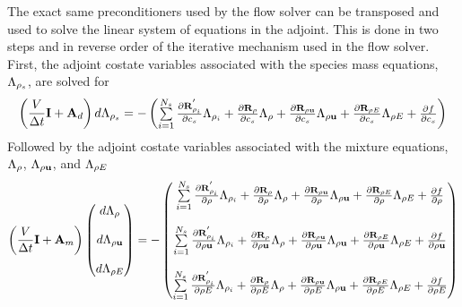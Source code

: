 \documentclass[a4paper]{report}
\begin{document}
The exact same preconditioners used by the flow solver can be transposed and
used to solve the linear system of equations in the adjoint.  This is done in
two steps and in reverse order of the iterative mechanism used in the flow
solver. First, the adjoint costate variables associated with the species mass
equations, $\Lambda_{\rho_s}$, are solved for
\begin{equation}
  \left( \frac{V}{\Delta t} \mi + \ma_d \right) d \adjlam{\rho_s}
  = -
  \begin{pmatrix}
    \lsum{i=1}{N_s}{\rlpprod{\rho_i}{c_s}} 
    + \rlprod{\rho}{c_s}
    + \rlprod{\rho \vu}{c_s}
    + \rlprod{\rho E}{c_s}
    + \pd{f}{c_s}
  \end{pmatrix}
  \label{dc-solve-adj}
\end{equation}
Followed by the adjoint costate variables associated with the mixture equations,
$\Lambda_{\rho}$, $\Lambda_{\rho \mathbf u}$, and $\Lambda_{\rho E}$
\begin{equation}
  \left( \frac{V}{\Delta t} \mi + \ma_m \right) 
  \begin{pmatrix}
    d \adjlam{\rho}     \\ \\
    d \adjlam{\rho \vu} \\ \\
    d \adjlam{\rho E}
  \end{pmatrix}
  = -
  \begin{pmatrix}
    \lsum{i=1}{N_s}{\rlpprod{\rho_i}{\rho}} + \rlprod{\rho}{\rho} + \rlprod{\rho \vu}{\rho} + \rlprod{\rho E}{\rho} + \pd{f}{\rho} \\ \\
    \lsum{i=1}{N_s}{\rlpprod{\rho_i}{\rho \vu}} + \rlprod{\rho}{\rho \vu} + \rlprod{\rho \vu}{\rho \vu} + \rlprod{\rho E}{\rho \vu} + \pd{f}{\rho \vu} \\ \\
    \lsum{i=1}{N_s}{\rlpprod{\rho_i}{\rho E}} + \rlprod{\rho}{\rho E} + \rlprod{\rho \vu}{\rho E} + \rlprod{\rho E}{\rho E} + \pd{f}{\rho E}
  \end{pmatrix}
  \label{mean-solve-adj}
\end{equation}
\end{document}
